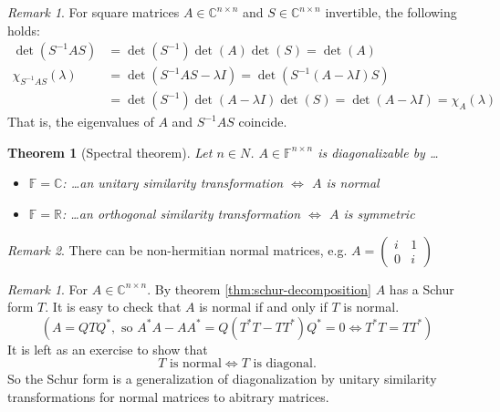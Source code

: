 \documentclass[12pt]{article}
\newcounter{lecture}
\newtheorem*{theorem*}{Theorem}
\theoremstyle{definition}
\theoremstyle{remark}
\newtheorem{remark}[theorem]{Remark}
\newtheorem*{remark*}{Remark}
\numberwithin{equation}{section}
\newcommand{\F}{\mathbb{F}}
\newcommand{\R}{\mathbb{R}}
\newcommand{\C}{\mathbb{C}}
\begin{document}
\begin{remark*} For square matrices $A \in \C^{n \times n}$ and $S \in \C^{n \times n}$ invertible, the following holds:
  \begin{align*}
    \det(S^{-1}AS) &= \det(S^{-1}) \det(A) \det(S) = \det(A) \\
    \chi_{S^{-1}AS}(\lambda) &= \det(S^{-1}AS - \lambda I) = \det(S^{-1}(A - \lambda I)S) \\
    &= \det(S^{-1}) \det(A - \lambda I) \det(S) = \det(A - \lambda I) = \chi_A(\lambda)
  \end{align*}
  That is, the eigenvalues of $A$ and $S^{-1}AS$ coincide.
\end{remark*}

\begin{mdframed}[linecolor=magenta, linewidth=1pt]
  {\color{magenta}
    \begin{theorem*}[Spectral theorem]
      Let $n\in N$. $A \in \F^{n \times n}$ is diagonalizable by \dots
      \begin{itemize}[label={}]
        \item $\F = \C$: \dots an unitary similarity transformation $\Leftrightarrow$ $A$ is normal
        \item $\F = \R$: \dots an orthogonal similarity transformation $\Leftrightarrow$ $A$ is symmetric
      \end{itemize}
  \end{theorem*}}
\end{mdframed}
\begin{remark*}
  There can be non-hermitian normal matrices, e.g. $A =
  \begin{pmatrix}
    i & 1 \\ 0 & i
  \end{pmatrix}$
\end{remark*}

\begin{remark}
  For $A \in \C^{n \times n}$. By theorem \ref{thm:schur-decomposition} $A$ has a Schur form $T$. It is easy to check that $A$ is normal if and only if $T$ is normal.
  \begin{equation*}
    (A = QTQ^*, \text{ so } A^*A - AA^* = Q(T^*T - TT^*)Q^* = 0 \Leftrightarrow T^*T = TT^*)
  \end{equation*}
  It is left as an exercise to show that
  \begin{equation*}
    T \text{ is normal} \Leftrightarrow T \text{ is diagonal}.
  \end{equation*}
  So the Schur form is a generalization of diagonalization by unitary similarity transformations for normal matrices to abitrary matrices.
\end{remark}
\end{document}
